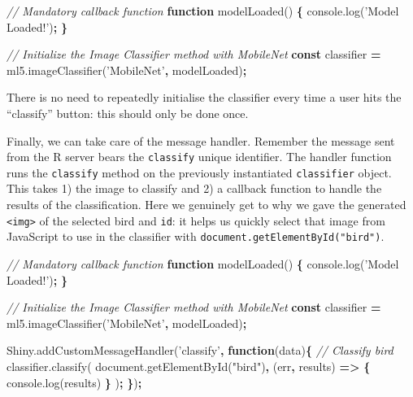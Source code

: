 \documentclass[10pt,]{krantz}
\makeatletter
\newenvironment{Shaded}{\begin{snugshade}}{\end{snugshade}}
\newcommand{\AttributeTok}[1]{\textcolor[rgb]{0.61,0.61,0.61}{#1}}
\newcommand{\CommentTok}[1]{\textcolor[rgb]{0.37,0.37,0.37}{\textit{#1}}}
\newcommand{\KeywordTok}[1]{\textcolor[rgb]{0.27,0.27,0.27}{\textbf{#1}}}
\newcommand{\NormalTok}[1]{#1}
\newcommand{\OperatorTok}[1]{\textcolor[rgb]{0.43,0.43,0.43}{\textbf{#1}}}
\newcommand{\StringTok}[1]{\textcolor[rgb]{0.5,0.5,0.5}{#1}}
\newcommand{\VariableTok}[1]{\textcolor[rgb]{0,0,0}{#1}}
\newenvironment{kframe}{%
\medskip{}
\setlength{\fboxsep}{.8em}
 \def\at@end@of@kframe{}%
 \ifinner\ifhmode%
  \def\at@end@of@kframe{\end{minipage}}%
  \begin{minipage}{\columnwidth}%
 \fi\fi%
 \def\FrameCommand##1{\hskip\@totalleftmargin \hskip-\fboxsep
 \colorbox{shadecolor}{##1}\hskip-\fboxsep
     \hskip-\linewidth \hskip-\@totalleftmargin \hskip\columnwidth}%
 \MakeFramed {\advance\hsize-\width
   \@totalleftmargin\z@ \linewidth\hsize
   \@setminipage}}%
 {\par\unskip\endMakeFramed%
 \at@end@of@kframe}
\renewenvironment{Shaded}{\begin{kframe}}{\end{kframe}}
\newenvironment{rmdblock}[1]
  {
  \begin{itemize}
  \renewcommand{\labelitemi}{
    \raisebox{-.7\height}[0pt][0pt]{
      {\setkeys{Gin}{width=3em,keepaspectratio}\texttt{[image: images/\#1]}}
    }
  }
  \setlength{\fboxsep}{1em}
  \begin{kframe}
  \item
  }
  {
  \end{kframe}
  \end{itemize}
  }
\newenvironment{rmdnote}
  {\begin{rmdblock}{note}}
  {\end{rmdblock}}
\makeatother
\begin{document}
\begin{Shaded}
\begin{Highlighting}[]
\CommentTok{// Mandatory callback function}
\KeywordTok{function} \AttributeTok{modelLoaded}\NormalTok{() }\OperatorTok{\{}
  \VariableTok{console}\NormalTok{.}\AttributeTok{log}\NormalTok{(}\StringTok{'Model Loaded!'}\NormalTok{)}\OperatorTok{;}
\OperatorTok{\}}

\CommentTok{// Initialize the Image Classifier method with MobileNet}
\KeywordTok{const}\NormalTok{ classifier }\OperatorTok{=} \VariableTok{ml5}\NormalTok{.}\AttributeTok{imageClassifier}\NormalTok{(}\StringTok{'MobileNet'}\OperatorTok{,}\NormalTok{ modelLoaded)}\OperatorTok{;}
\end{Highlighting}
\end{Shaded}

\begin{rmdnote}
There is no need to repeatedly initialise the classifier every time a
user hits the ``classify'' button: this should only be done once.
\end{rmdnote}

Finally, we can take care of the message handler. Remember the message sent from the R server bears the \texttt{classify} unique identifier. The handler function runs the \texttt{classify} method on the previously instantiated \texttt{classifier} object. This takes 1) the image to classify and 2) a callback function to handle the results of the classification. Here we genuinely get to why we gave the generated \texttt{\textless{}img\textgreater{}} of the selected bird and \texttt{id}: it helps us quickly select that image from JavaScript to use in the classifier with \texttt{document.getElementById("bird")}.

\begin{Shaded}
\begin{Highlighting}[]
\CommentTok{// Mandatory callback function}
\KeywordTok{function} \AttributeTok{modelLoaded}\NormalTok{() }\OperatorTok{\{}
  \VariableTok{console}\NormalTok{.}\AttributeTok{log}\NormalTok{(}\StringTok{'Model Loaded!'}\NormalTok{)}\OperatorTok{;}
\OperatorTok{\}}

\CommentTok{// Initialize the Image Classifier method with MobileNet}
\KeywordTok{const}\NormalTok{ classifier }\OperatorTok{=} \VariableTok{ml5}\NormalTok{.}\AttributeTok{imageClassifier}\NormalTok{(}\StringTok{'MobileNet'}\OperatorTok{,}\NormalTok{ modelLoaded)}\OperatorTok{;}

\VariableTok{Shiny}\NormalTok{.}\AttributeTok{addCustomMessageHandler}\NormalTok{(}\StringTok{'classify'}\OperatorTok{,} \KeywordTok{function}\NormalTok{(data)}\OperatorTok{\{}
  \CommentTok{// Classify bird}
  \VariableTok{classifier}\NormalTok{.}\AttributeTok{classify}\NormalTok{(}
    \VariableTok{document}\NormalTok{.}\AttributeTok{getElementById}\NormalTok{(}\StringTok{"bird"}\NormalTok{)}\OperatorTok{,}\NormalTok{ (err}\OperatorTok{,}\NormalTok{ results) }\KeywordTok{=>} \OperatorTok{\{}
      \VariableTok{console}\NormalTok{.}\AttributeTok{log}\NormalTok{(results)}
    \OperatorTok{\}}
\NormalTok{  )}\OperatorTok{;}
\OperatorTok{\}}\NormalTok{)}\OperatorTok{;}
\end{Highlighting}
\end{Shaded}
\end{document}
